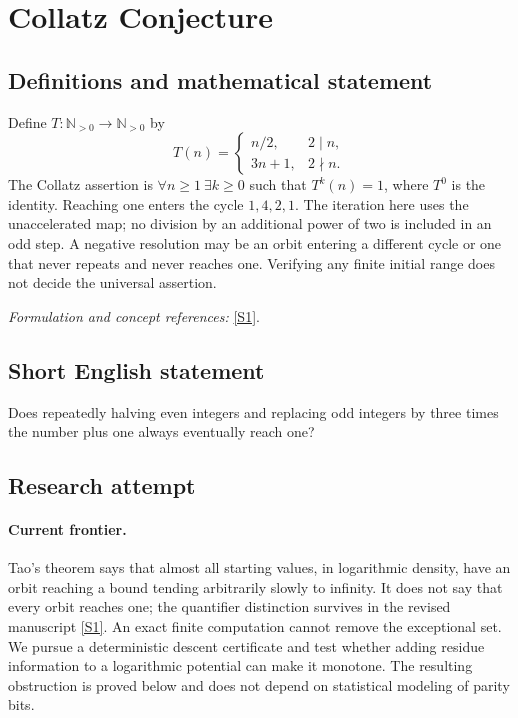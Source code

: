 \documentclass[11pt,a4paper]{article}
\newcommand{\N}{\mathbb{N}}
\newcommand{\sref}[2]{\hyperlink{source:#1:#2}{[S#2]}}
\newif\ifshowcatalogue
\newcommand{\cataloguescope}[1]{\ifshowcatalogue
 \paragraph{Exact scope in the supplied catalogue.}
 \begin{quote}\small #1\end{quote}\fi}
\numberwithin{equation}{section}
\begin{document}
\setcounter{section}{0}
\clearpage
\section*{\texorpdfstring{Collatz Conjecture}{Collatz Conjecture}}\label{statement}
\subsection{Definitions and mathematical statement}
Define $T:\N_{>0}\to\N_{>0}$ by
\[
 T(n)=\begin{cases}n/2,&2\mid n,\\3n+1,&2\nmid n.\end{cases}
\]
The Collatz assertion is $\forall n\ge1\ \exists k\ge0$ such that $T^k(n)=1$, where $T^0$ is the identity. Reaching one enters the cycle $1,4,2,1$. The iteration here uses the unaccelerated map; no division by an additional power of two is included in an odd step. A negative resolution may be an orbit entering a different cycle or one that never repeats and never reaches one. Verifying any finite initial range does not decide the universal assertion.
\par\smallskip\textit{Formulation and concept references:} \sref{statement}{1}.
\cataloguescope{Prove or disprove that, for every positive integer N, repeated application of N -> N/2 when N is even and N -> 3N+1 when N is odd eventually reaches 1.}
\subsection{Short English statement}
Does repeatedly halving even integers and replacing odd integers by three times the number plus one always eventually reach one?
\subsection{Research attempt}

\paragraph{Current frontier.}
Tao's theorem says that almost all starting values, in logarithmic density, have an orbit reaching a bound tending arbitrarily slowly to infinity. It does not say that every orbit reaches one; the quantifier distinction survives in the revised manuscript \sref{statement}{1}. An exact finite computation cannot remove the exceptional set. We pursue a deterministic descent certificate and test whether adding residue information to a logarithmic potential can make it monotone. The resulting obstruction is proved below and does not depend on statistical modeling of parity bits.
\end{document}
